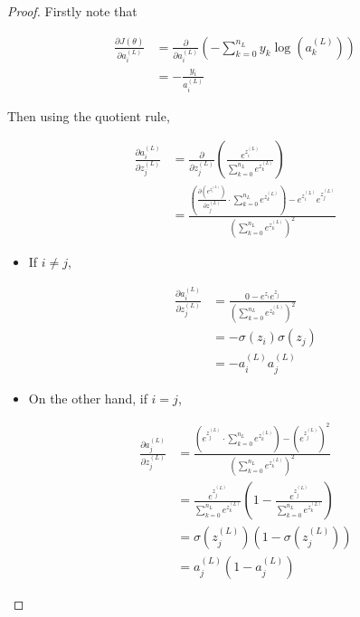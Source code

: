 \documentclass{article}[11pt]
\begin{document}
        
        \begin{proof}
            
            Firstly note that
            
            $$ \begin{aligned}
            \frac{\partial J(\theta)}{\partial a^{(L)}_i}
            &= \frac{\partial}{\partial a^{(L)}_i} \left( - \sum_{k=0}^{n_L} y_k \log(a^{(L)}_k) \right) \\
            &= - \frac{y_i}{a^{(L)}_i}
            \end{aligned} $$
            
            
            Then using the quotient rule,
            
            $$ \begin{aligned}
            \frac{\partial a^{(L)}_i}{\partial z^{(L)}_j}
            &= \frac{\partial}{\partial z^{(L)}_j} \left( \frac{e^{z^{(L)}_i}}{\sum_{k=0}^{n_L} e^{z^{(L)}_k}} \right) \\
            &= \frac{\left( \frac{\partial \left( e^{z^{(L)}_i}\right)}{\partial z^{(L)}_j} \cdot \sum_{k=0}^{n_L} e^{z^{(L)}_k} \right) - e^{z^{(L)}_i} e^{z^{(L)}_j}}{\left( \sum_{k=0}^{n_L} e^{z^{(L)}_k} \right)^2}
            \end{aligned} $$
            
            \begin{itemize}
            
                \item If $i \neq j$,
            
                $$ \begin{aligned}
                \frac{\partial a^{(L)}_i}{\partial z^{(L)}_j}
                &= \frac{0 - e^{z_i} e^{z_j}}{\left( \sum_{k=0}^{n_L} e^{z^{(L)}_k} \right)^2} \\
                &= - \sigma(z_i) \sigma(z_j) \\
                &= - a^{(L)}_i a^{(L)}_j
                \end{aligned} $$
            
                \item On the other hand, if $i = j$,
            
                $$ \begin{aligned}
                \frac{\partial a^{(L)}_j}{\partial z^{(L)}_j}
                &= \frac{\left( e^{z^{(L)}_j} \cdot \sum_{k=0}^{n_L} e^{z^{(L)}_k} \right) - \left( e^{z^{(L)}_j} \right)^2}{\left( \sum_{k=0}^{n_L} e^{z^{(L)}_k} \right)^2} \\
                &= \frac{e^{z^{(L)}_j}}{\sum_{k=0}^{n_L} e^{z^{(L)}_k}} \left( 1 - \frac{e^{z^{(L)}_j}}{\sum_{k=0}^{n_L} e^{z^{(L)}_k}} \right) \\
                &= \sigma(z^{(L)}_j) \left( 1 - \sigma(z^{(L)}_j) \right) \\
                &= a^{(L)}_j \left( 1 - a^{(L)}_j \right)
                \end{aligned} $$
            

\end{itemize}
\end{proof}
\end{document}
